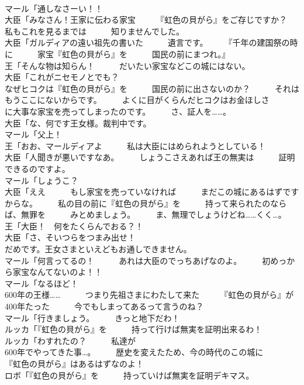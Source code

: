 \documentclass[8pt]{extreport}
\begin{document}
\begin{CJK}{UTF8}{min}
\\	マール「通しなさーい！！	
\\	大臣「みなさん！王家に伝わる家宝　　　『虹色の貝がら』をご存じですか？　　　私もこれを見るまでは　　　知りませんでした。	
\\	大臣「ガルディアの遠い祖先の書いた　　　遺言です。　　　『千年の建国祭の時に　　　家宝『虹色の貝がら』を　　　国民の前にまつれ。』	
\\	王「そんな物は知らん！　　　だいたい家宝などこの城にはない。	
\\	大臣「これがニセモノとでも？	
\\	なぜヒコクは『虹色の貝がら』を　　　国民の前に出さないのか？　　　それはもうここにないからです。　　　よくに目がくらんだヒコクはお金ほしさ　　　に大事な家宝を売ってしまったのです。　　　さ、証人を……。	
\\	大臣「な、何です王女様。裁判中です。	
\\	マール「父上！	
\\	王「おお、マールディアよ　　　私は大臣にはめられようとしている！	
\\	大臣「人聞きが悪いですなあ。　　　しょうこさえあれば王の無実は　　　証明できるのですよ。	
\\	マール「しょうこ？	
\\	大臣「ええ　　　もし家宝を売っていなければ　　　まだこの城にあるはずですからな。　　　私の目の前に『虹色の貝がら』を　　　持って来られたのならば、無罪を　　　みとめましょう。　　　ま、無理でしょうけどね……くく…。	
\\	王「大臣！　何をたくらんでおる？！	
\\	大臣「さ、そいつらをつまみ出せ！	
\\	だめです。王女さまといえどもお通しできません。	
\\	マール「何言ってるの！　　　あれは大臣のでっちあげなのよ。　　　初めっから家宝なんてないのよ！！	
\\	マール「なるほど！　　　
\\	600年の王様……　　　つまり先祖さまにわたして来た　　　『虹色の貝がら』が400年たった　　　今でもしまってあるって言うのね？	
\\	マール「行きましょう。　　　きっと地下だわ！	
\\	ルッカ「『虹色の貝がら』を　　　持って行けば無実を証明出来るわ！	
\\	ルッカ「わすれたの？　　　私達が
\\	600年でやってきた事…。　　　歴史を変えたため、今の時代のこの城に　　　『虹色の貝がら』はあるはずなのよ！	
\\	ロボ「『虹色の貝がら』を　　　持っていけば無実を証明デキマス。	

\end{CJK}
\end{document}

